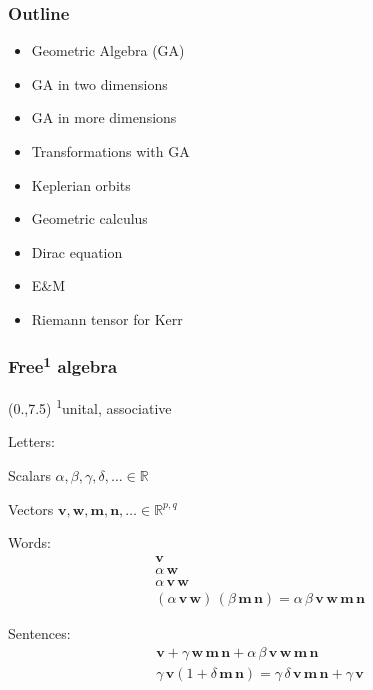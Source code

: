 \documentclass[12pt,xcolor={dvipsnames}]{beamer}
\renewcommand{\vec}{\bm}
\begin{document}
\begin{frame}
  \frametitle{Outline}
  \begin{itemize}
   \item Geometric Algebra (GA)
   \item GA in two dimensions
   \item GA in more dimensions
   \item Transformations with GA
   \item Keplerian orbits
   \item Geometric calculus
   \item Dirac equation
   \item E\&M
   \item Riemann tensor for Kerr
  \end{itemize}
\end{frame}



\begin{frame}
  \frametitle{Free\textsuperscript{1} algebra}
  \begin{textblock}{4}(0.,7.5) \scriptsize{\textsuperscript{1}unital,
      associative}
  \end{textblock}

  Letters: \vspace{-0.1in}
  \begin{center}
    Scalars $\alpha, \beta, \gamma, \delta, \ldots \in \mathbb{R}$

    Vectors $\vec{v}, \vec{w}, \vec{m}, \vec{n}, \ldots \in
    \mathbb{R}^{p,q}$
  \end{center}
  \pause \vspace{-0.05in}

  Words: \vspace{-0.2in}
  \begin{gather*}
    \vec{v}
    \\
    \alpha\, \vec{w}
    \\
    \alpha\, \vec{v}\, \vec{w}
    \\
    (\alpha\, \vec{v}\, \vec{w})\, (\beta\, \vec{m}\, \vec{n}) =
    \alpha\, \beta\, \vec{v}\, \vec{w}\, \vec{m}\, \vec{n}
  \end{gather*}
  \pause \vspace{-0.2in}

  Sentences: \vspace{-0.15in}
  \begin{gather*}
    \vec{v} + \gamma\, \vec{w}\, \vec{m}\, \vec{n} + \alpha\, \beta\,
    \vec{v}\, \vec{w}\, \vec{m}\, \vec{n}
    \\
    \gamma\, \vec{v}(1 + \delta\, \vec{m}\, \vec{n}) = \gamma\,
    \delta\, \vec{v}\, \vec{m}\, \vec{n} + \gamma\, \vec{v}
  \end{gather*}

\end{frame}
\end{document}
